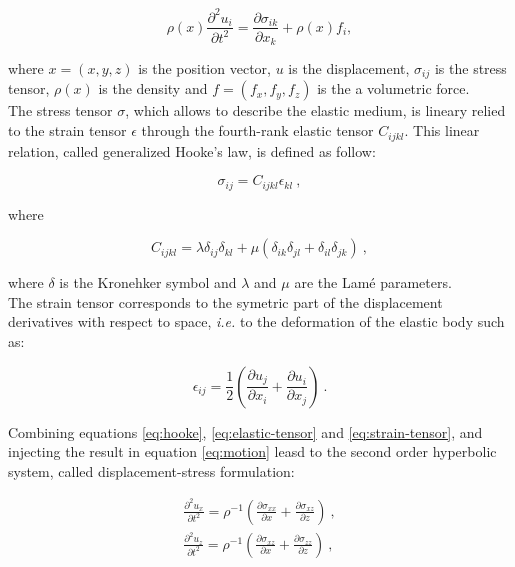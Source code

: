 \documentclass{gnulike}
\begin{document}
\begin{equation}
  \label{eq:motion}
  \rho(x) \frac{\partial^{2}u_{i}}{\partial t^{2}} = \frac{\partial \sigma_{ik}}{\partial x_{k}} + \rho(x)f_{i} ,
\end{equation}

\noindent where $x=(x,y,z)$ is the position vector, $u$ is the displacement, $\sigma_{ij}$ is the stress tensor, $\rho(x)$ is the density and $f=(f_{x}, f_{y}, f_{z})$ is the a volumetric force.\\

\noindent The stress tensor $\sigma$, which allows to describe the elastic medium, is lineary relied to the strain tensor $\epsilon$ through the fourth-rank elastic tensor $C_{ijkl}$. This linear relation, called generalized Hooke's law,  is defined as follow:

\begin{equation}
  \label{eq:hooke}
  \sigma_{ij} = C_{ijkl}\epsilon_{kl}\ ,
\end{equation} 

\noindent where

\begin{equation}
  \label{eq:elastic-tensor}
  C_{ijkl} = \lambda \delta_{ij} \delta_{kl} + \mu (\delta_{ik}\delta_{jl}+\delta_{il}\delta_{jk})\ ,
\end{equation}

\noindent where $\delta$ is the Kronehker symbol and $\lambda$ and $\mu$ are the Lam\'e parameters.\\

\noindent The strain tensor corresponds to the symetric part of the displacement derivatives with respect to space, \textit{i.e.} to the deformation of the elastic body such as:

\begin{equation}
  \label{eq:strain-tensor}
  \epsilon_{ij} = \frac{1}{2} \left( \frac{\partial u_{j}}{\partial x_{i}} + \frac{\partial u_{i}}{\partial x_{j}} \right)\ .
\end{equation}

\noindent Combining equations \ref{eq:hooke}, \ref{eq:elastic-tensor} and \ref{eq:strain-tensor}, and injecting the result in equation \ref{eq:motion} leasd to the second order hyperbolic system, called displacement-stress formulation:

\begin{eqnarray}
  \label{eq:displacement-stress}
  \frac{\partial ^{2} u_{x}}{\partial t^{2}} = \rho^{{\scriptscriptstyle-1}} \left( \frac{\partial \sigma_{xx}}{\partial x} + \frac{\partial \sigma_{xz}}{\partial z} \right)\ , \nonumber \\
  \frac{\partial ^{2} u_{z}}{\partial t^{2}} = \rho^{{\scriptscriptstyle -1}} \left( \frac{\partial \sigma_{xz}}{\partial x} + \frac{\partial \sigma_{zz}}{\partial z} \right)\ ,
\end{eqnarray}
\end{document}
